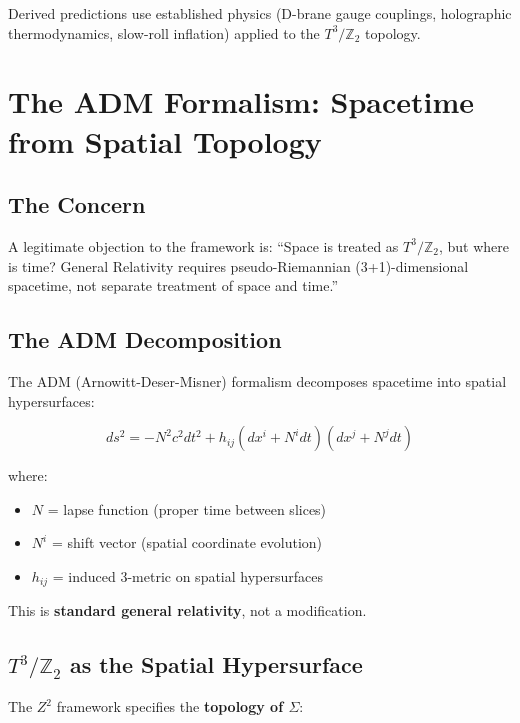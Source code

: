 \documentclass[12pt,a4paper]{article}
\newcommand{\Ztwo}{\mathbb{Z}_2}
\newcommand{\Tthree}{T^3}
\newcommand{\Zsq}{Z^2}
\begin{document}
Derived predictions use established physics (D-brane gauge couplings, holographic thermodynamics, slow-roll inflation) applied to the $\Tthree/\Ztwo$ topology.

\section{The ADM Formalism: Spacetime from Spatial Topology}
\label{sec:adm}

\subsection{The Concern}

A legitimate objection to the framework is: ``Space is treated as $\Tthree/\Ztwo$, but where is time? General Relativity requires pseudo-Riemannian (3+1)-dimensional spacetime, not separate treatment of space and time.''

\subsection{The ADM Decomposition}

The ADM (Arnowitt-Deser-Misner) formalism decomposes spacetime into spatial hypersurfaces:

\begin{equation}
ds^2 = -N^2 c^2 dt^2 + h_{ij}(dx^i + N^i dt)(dx^j + N^j dt)
\end{equation}

where:
\begin{itemize}
    \item $N$ = lapse function (proper time between slices)
    \item $N^i$ = shift vector (spatial coordinate evolution)
    \item $h_{ij}$ = induced 3-metric on spatial hypersurfaces
\end{itemize}

This is \textbf{standard general relativity}, not a modification.

\subsection{$\Tthree/\Ztwo$ as the Spatial Hypersurface}

The $\Zsq$ framework specifies the \textbf{topology of $\Sigma$}:
\end{document}

